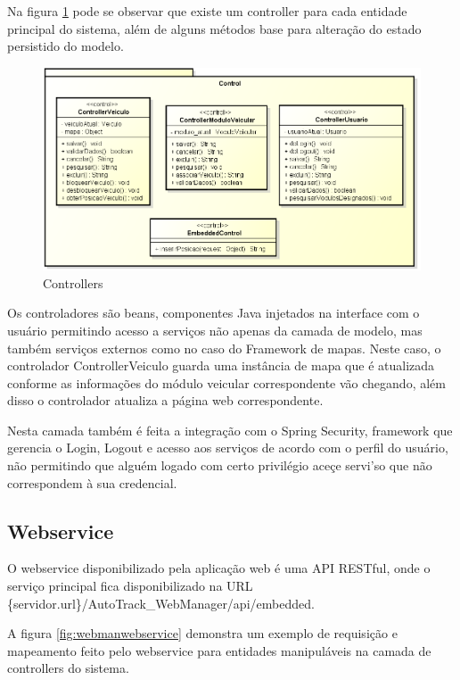 Na figura \ref{fig:webmancontrol} pode se observar que existe um controller para cada entidade principal do sistema, além de alguns métodos base para alteração do estado persistido do modelo.

\begin{figure}[!htb]
	\centering
	\includegraphics[width=\textwidth]{figures/webm_control.png}
	\caption{Controllers}
	\label{fig:webmancontrol}
\end{figure}

Os controladores são beans, componentes Java injetados na interface com o usuário permitindo acesso a serviços não apenas da camada de modelo, mas também serviços externos como no caso do Framework de mapas. Neste caso, o controlador ControllerVeiculo guarda uma instância de mapa que é atualizada conforme as informações do módulo veicular correspondente vão chegando, além disso o controlador atualiza a página web correspondente.

Nesta camada também é feita a integração com o Spring Security, framework que gerencia o Login, Logout e acesso aos serviços de acordo com o perfil do usuário, não permitindo que alguém logado com certo privilégio aceçe servi'so que não correspondem à sua credencial.

\newpage

\subsection {Webservice}

O webservice disponibilizado pela aplicação web é uma API RESTful, onde o serviço principal fica disponibilizado na URL \{servidor.url\}/AutoTrack\_WebManager/api/embedded. 

A figura \ref{fig:webmanwebservice} demonstra um exemplo de requisição e mapeamento feito pelo webservice para entidades manipuláveis na camada de controllers do sistema.


